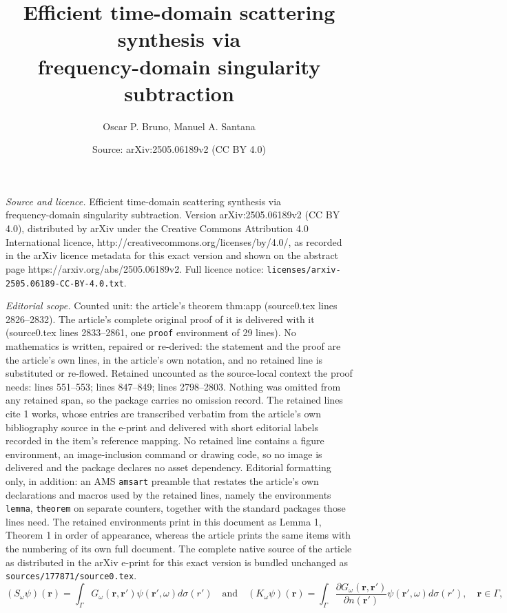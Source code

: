 \documentclass[10pt,a4paper]{amsart}
\title{Efficient time-domain scattering synthesis via\\ frequency-domain singularity subtraction}
\author{Oscar P. Bruno, Manuel A. Santana}
\date{Source: arXiv:2505.06189v2 (CC BY 4.0)}
\def \br{\mathbf{r}}
\begin{document}
\maketitle

\noindent\emph{Source and licence.} Efficient time-domain scattering synthesis via\\ frequency-domain singularity subtraction. Version arXiv:2505.06189v2 (CC BY 4.0), distributed by arXiv under the Creative Commons Attribution 4.0 International licence, http://creativecommons.org/licenses/by/4.0/, as recorded in the arXiv licence metadata for this exact version and shown on the abstract page https://arxiv.org/abs/2505.06189v2. Full licence notice: \texttt{licenses/arxiv-2505.06189-CC-BY-4.0.txt}.\par\smallskip

\noindent\textit{Editorial scope.} Counted unit: the article's theorem thm:app (source0.tex lines 2826--2832). The article's complete original proof of it is delivered with it (source0.tex lines 2833--2861, one \texttt{proof} environment of 29 lines). No mathematics is written, repaired or re-derived: the statement and the proof are the article's own lines, in the article's own notation, and no retained line is substituted or re-flowed.  Retained uncounted as the source-local context the proof needs: lines 551--553; lines 847--849; lines 2798--2803.  Nothing was omitted from any retained span, so the package carries no omission record.  The retained lines cite 1 works, whose entries are transcribed verbatim from the article's own bibliography source in the e-print and delivered with short editorial labels recorded in the item's reference mapping.  No retained line contains a figure environment, an image-inclusion command or drawing code, so no image is delivered and the package declares no asset dependency.  Editorial formatting only, in addition: an AMS \texttt{amsart} preamble that restates the article's own declarations and macros used by the retained lines, namely the environments \texttt{lemma}, \texttt{theorem} on separate counters, together with the standard packages those lines need.  The retained environments print in this document as Lemma 1, Theorem 1 in order of appearance, whereas the article prints the same items with the numbering of its own full document.  The complete native source of the article as distributed in the arXiv e-print for this exact version is bundled unchanged as \texttt{sources/177871/source0.tex}.
 \begin{equation}\label{eqn:sl_dl_operator}
    (S_\omega\psi)(\br) = \int_\Gamma G_\omega(\br,\br')\psi(\br',\omega)d\sigma(r') \quad \text{and} \quad (K_\omega \psi)(\br) = \int_{\Gamma}\frac{\partial G_\omega(\br,\br')}{\partial n(\br')}\psi(\br',\omega)d\sigma(r'), \quad \br \in \Gamma,
\end{equation}
\end{document}
